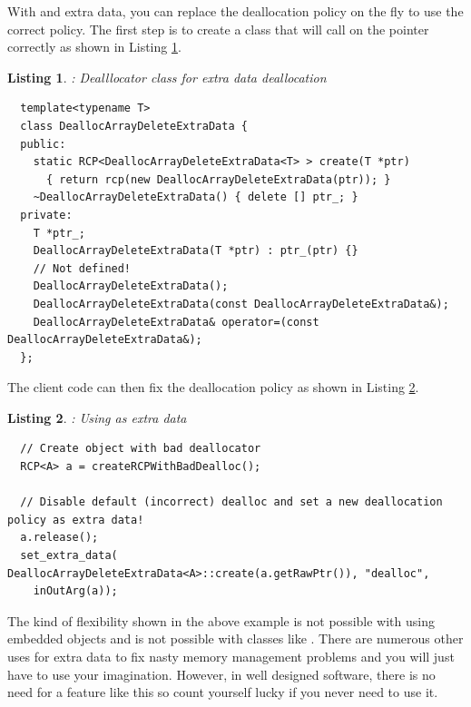 \documentclass[pdf,ps2pdf,11pt]{SANDreport}
\newtheorem{listing}{Listing}
\begin{document}
With {} and extra data, you can replace the deallocation
policy on the fly to use the correct policy.  The first step is to
create a class that will call {} on the pointer
correctly as shown in Listing
{}\ref{listing:DeallocArrayDeleteExtraData}.

\begin{listing}: Dealllocator class for extra data deallocation \\
\label{listing:DeallocArrayDeleteExtraData}
{\small\begin{verbatim}
  template<typename T>
  class DeallocArrayDeleteExtraData {
  public:
    static RCP<DeallocArrayDeleteExtraData<T> > create(T *ptr)
      { return rcp(new DeallocArrayDeleteExtraData(ptr)); }
    ~DeallocArrayDeleteExtraData() { delete [] ptr_; }
  private:
    T *ptr_;
    DeallocArrayDeleteExtraData(T *ptr) : ptr_(ptr) {}
    // Not defined!
    DeallocArrayDeleteExtraData();
    DeallocArrayDeleteExtraData(const DeallocArrayDeleteExtraData&);
    DeallocArrayDeleteExtraData& operator=(const DeallocArrayDeleteExtraData&);
  };
\end{verbatim}}
\end{listing}

The client code can then fix the deallocation policy as shown in
Listing {}\ref{listing:using-DeallocArrayDeleteExtraData}.

\begin{listing}: Using {} as extra data \\
\label{listing:using-DeallocArrayDeleteExtraData}
{\small\begin{verbatim}
  // Create object with bad deallocator
  RCP<A> a = createRCPWithBadDealloc();

  // Disable default (incorrect) dealloc and set a new deallocation policy as extra data!
  a.release();
  set_extra_data( DeallocArrayDeleteExtraData<A>::create(a.getRawPtr()), "dealloc",
    inOutArg(a));
\end{verbatim}}
\end{listing}

The kind of flexibility shown in the above example is not possible
with using embedded objects and is not possible with classes like
{}.  There are numerous other uses for extra
data to fix nasty memory management problems and you will just have to
use your imagination.  However, in well designed software, there is no
need for a feature like this so count yourself lucky if you never need
to use it.
\end{document}
